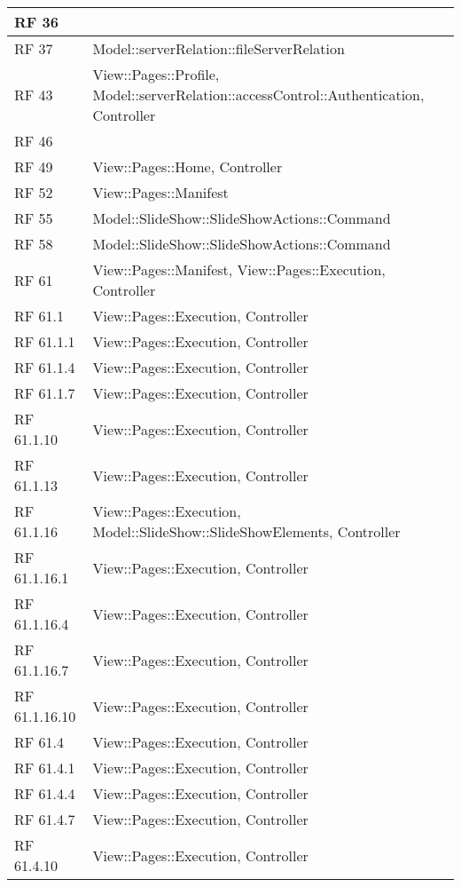 {\begin{longtable} [c]{| p{2cm} | p{13cm} |}
 \hline 
RF 36 & \\ 
 \hline 
RF 37 & Model::\-serverRelation::\-fileServerRelation\\ 
 \hline 
RF 43 & View::\-Pages::\-Profile, Model::\-serverRelation::\-accessControl::\-Authentication, Controller\\ 
 \hline 
RF 46 & \\ 
 \hline 
RF 49 & View::\-Pages::\-Home, Controller\\ 
 \hline 
RF 52 & View::\-Pages::\-Manifest\\ 
 \hline 
RF 55 & Model::\-SlideShow::\-SlideShowActions::\-Command\\ 
 \hline 
RF 58 & Model::\-SlideShow::\-SlideShowActions::\-Command\\ 
 \hline 
RF 61 & View::\-Pages::\-Manifest, View::\-Pages::\-Execution, Controller\\ 
 \hline 
RF 61.1 & View::\-Pages::\-Execution, Controller\\ 
 \hline 
RF 61.1.1 & View::\-Pages::\-Execution, Controller\\ 
 \hline 
RF 61.1.4 & View::\-Pages::\-Execution, Controller\\ 
 \hline 
RF 61.1.7 & View::\-Pages::\-Execution, Controller\\ 
 \hline 
RF 61.1.10 & View::\-Pages::\-Execution, Controller\\ 
 \hline 
RF 61.1.13 & View::\-Pages::\-Execution, Controller\\ 
 \hline 
RF 61.1.16 & View::\-Pages::\-Execution, Model::\-SlideShow::\-SlideShowElements, Controller\\ 
 \hline 
RF 61.1.16.1 & View::\-Pages::\-Execution, Controller\\ 
 \hline 
RF 61.1.16.4 & View::\-Pages::\-Execution, Controller\\ 
 \hline 
RF 61.1.16.7 & View::\-Pages::\-Execution, Controller\\ 
 \hline 
RF 61.1.16.10 & View::\-Pages::\-Execution, Controller\\ 
 \hline 
RF 61.4 & View::\-Pages::\-Execution, Controller\\ 
 \hline 
RF 61.4.1 & View::\-Pages::\-Execution, Controller\\ 
 \hline 
RF 61.4.4 & View::\-Pages::\-Execution, Controller\\ 
 \hline 
RF 61.4.7 & View::\-Pages::\-Execution, Controller\\ 
 \hline 
RF 61.4.10 & View::\-Pages::\-Execution, Controller\\ 

\end{longtable}}
